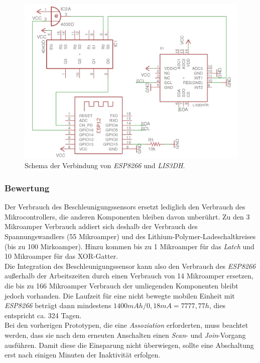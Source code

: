 \begin{figure}[h]
  \centering
	\includegraphics[width=\textwidth]{images/schematics.png}
  \caption{Schema der Verbindung von \emph{ESP8266} und \emph{LIS3DH}.}
  \label{fig:schematics}
\end{figure}

\subsubsection{Bewertung}
Der Verbrauch des Beschleunigungssensors ersetzt lediglich den Verbrauch des Mikrocontrollers, die anderen Komponenten bleiben davon unberührt.
Zu den 3 Mikroamper Verbrauch addiert sich deshalb der Verbrauch des Spannungswandlers (55 Mikroamper) und des Lithium-Polymer-Ladeschaltkreises (bis zu 100 Mirkoamper).
Hinzu kommen bis zu 1 Mikroamper für das \emph{Latch} und 10 Mikroamper für das XOR-Gatter.\\
Die Integration des Beschleunigungssensor kann also den Verbrauch des \emph{ESP8266} außerhalb der Arbeitszeiten durch einen Verbrauch von 14 Mikroamper ersetzen, die bis zu 166 Mikroamper Verbrauch der umliegenden Komponenten bleibt jedoch vorhanden.
Die Laufzeit für eine nicht bewegte mobilen Einheit mit \emph{ESP8266} beträgt dann mindestens $1400mAh / 0,18mA = 7777,77h$, dies entspricht ca. 324 Tagen.\\
Bei den vorherigen Prototypen, die eine \emph{Assoziation} erforderten, muss beachtet werden, dass sie nach dem erneuten Anschalten einen \emph{Scan}- und \emph{Join}-Vorgang ausführen.
Damit diese die Einsparung nicht überwiegen, sollte eine Abschaltung erst nach einigen Minuten der Inaktivität erfolgen.


